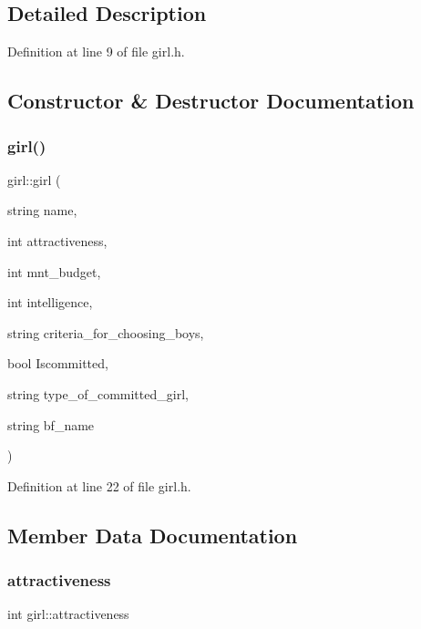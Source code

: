 \subsection{Detailed Description}


Definition at line 9 of file girl.\+h.



\subsection{Constructor \& Destructor Documentation}
\mbox{\label{classgirl_a515ef3f56aaa368ff430235e10b805c4}} 
\subsubsection{\texorpdfstring{girl()}{girl()}}
{\footnotesize\ttfamily girl\+::girl (\begin{DoxyParamCaption}\item[{string}]{name,  }\item[{int}]{attractiveness,  }\item[{int}]{mnt\+\_\+budget,  }\item[{int}]{intelligence,  }\item[{string}]{criteria\+\_\+for\+\_\+choosing\+\_\+boys,  }\item[{bool}]{Iscommitted,  }\item[{string}]{type\+\_\+of\+\_\+committed\+\_\+girl,  }\item[{string}]{bf\+\_\+name }\end{DoxyParamCaption})\hspace{0.3cm}{\ttfamily [inline]}}



Definition at line 22 of file girl.\+h.



\subsection{Member Data Documentation}
\mbox{\label{classgirl_a0ba667f73d41f7bc3236141daaec9246}} 
\subsubsection{\texorpdfstring{attractiveness}{attractiveness}}
{\footnotesize\ttfamily int girl\+::attractiveness}



